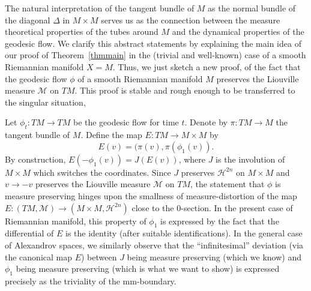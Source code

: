 \documentclass[12pt,leqno]{amsart}
\numberwithin{equation}{section}
\theoremstyle{definition}
\theoremstyle{remark}
\newcommand{\tref}[1]{Theorem~\ref{#1}}
\def\:{\colon}
\begin{document}
The natural interpretation of the tangent bundle of $M$ as the normal  bundle of the diagonal $\Delta$ in $M\times M$ serves us as the connection between
the measure theoretical properties of the tubes around $M$ and the dynamical properties of the geodesic flow.
We clarify this abstract statements by explaining the main idea of  our  proof of \tref{thmmain} in the (trivial and well-known) case of a smooth Riemannian manifold $X=M$.
Thus, we just sketch a new proof,  of the fact   that the geodesic flow $\phi$ of a smooth Riemannian manifold $M$ preserves the Liouville measure $\mathcal M$ on $TM$.
This proof is stable and rough enough to be transferred to the singular situation,

Let  $\phi_t\: TM\to TM$ be the geodesic flow for time $t$.
Denote by $\pi\: TM\to M$ the tangent bundle of $M$. Define the map $E\:TM\to M\times M$  by
\[E(v)=(\pi(v), \pi (\phi _1 (v)).\]
By construction, $E(-\phi_1(v))= J(E(v))$,
where $J$ is the involution of $M\times M$ which switches the coordinates.
Since $J$ preserves $\mathcal H^{2n}$ on $M\times M$ and $v\to -v$ preserves the Liouville measure $\mathcal M$ on $TM$,
the statement that $\phi$ is measure preserving hinges upon the smallness of measure-distortion of the map $E \:(TM,\mathcal M) \to (M\times M, \mathcal H^{2n})$ close to the $0$-section.
In the present case of Riemannian manifold,
this property of $\phi_1$ is expressed by  the fact that the differential of $E$ is the identity (after suitable identifications).
In the general case of Alexandrov spaces, we similarly observe that the ``infinitesimal'' deviation (via the canonical map $E$) between $J$ being measure preserving (which we know) and  $\phi _1$ being measure preserving (which is what we want to show)
is expressed precisely as the triviality of  the mm-boundary.






\end{document}
